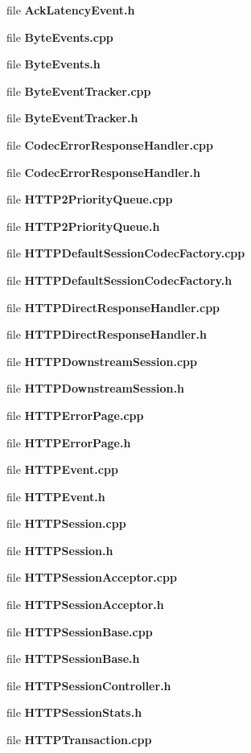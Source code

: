 \begin{DoxyCompactItemize}
\item 
file {\bf Ack\+Latency\+Event.\+h}
\item 
file {\bf Byte\+Events.\+cpp}
\item 
file {\bf Byte\+Events.\+h}
\item 
file {\bf Byte\+Event\+Tracker.\+cpp}
\item 
file {\bf Byte\+Event\+Tracker.\+h}
\item 
file {\bf Codec\+Error\+Response\+Handler.\+cpp}
\item 
file {\bf Codec\+Error\+Response\+Handler.\+h}
\item 
file {\bf H\+T\+T\+P2\+Priority\+Queue.\+cpp}
\item 
file {\bf H\+T\+T\+P2\+Priority\+Queue.\+h}
\item 
file {\bf H\+T\+T\+P\+Default\+Session\+Codec\+Factory.\+cpp}
\item 
file {\bf H\+T\+T\+P\+Default\+Session\+Codec\+Factory.\+h}
\item 
file {\bf H\+T\+T\+P\+Direct\+Response\+Handler.\+cpp}
\item 
file {\bf H\+T\+T\+P\+Direct\+Response\+Handler.\+h}
\item 
file {\bf H\+T\+T\+P\+Downstream\+Session.\+cpp}
\item 
file {\bf H\+T\+T\+P\+Downstream\+Session.\+h}
\item 
file {\bf H\+T\+T\+P\+Error\+Page.\+cpp}
\item 
file {\bf H\+T\+T\+P\+Error\+Page.\+h}
\item 
file {\bf H\+T\+T\+P\+Event.\+cpp}
\item 
file {\bf H\+T\+T\+P\+Event.\+h}
\item 
file {\bf H\+T\+T\+P\+Session.\+cpp}
\item 
file {\bf H\+T\+T\+P\+Session.\+h}
\item 
file {\bf H\+T\+T\+P\+Session\+Acceptor.\+cpp}
\item 
file {\bf H\+T\+T\+P\+Session\+Acceptor.\+h}
\item 
file {\bf H\+T\+T\+P\+Session\+Base.\+cpp}
\item 
file {\bf H\+T\+T\+P\+Session\+Base.\+h}
\item 
file {\bf H\+T\+T\+P\+Session\+Controller.\+h}
\item 
file {\bf H\+T\+T\+P\+Session\+Stats.\+h}
\item 
file {\bf H\+T\+T\+P\+Transaction.\+cpp}
\item 

\end{DoxyCompactItemize}
